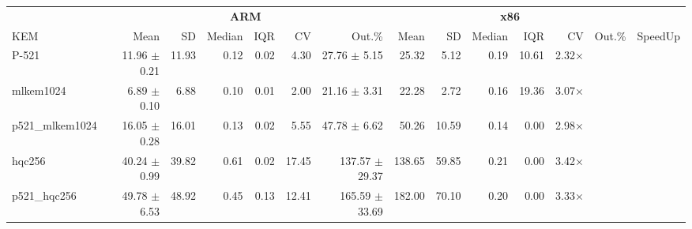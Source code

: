 \begin{table}[!ht]
\centering
\begin{tabular}{l|rrrrrr|rrrrrr|r}
\toprule
& \multicolumn{6}{c}{\bfseries ARM} & \multicolumn{6}{c}{\bfseries x86} & \\
\cmidrule(lr){2-7} \cmidrule(lr){8-13}
KEM 			& Mean & SD & Median & IQR & CV & Out.\% 		    & Mean & SD & Median & IQR & CV & Out.\% & SpeedUp \\
\midrule
P-521 			& 11.96 $\pm$ 0.21 & 11.93 & 0.12 & 0.02 & 4.30 	& 27.76 $\pm$ 5.15 & 25.32 & 5.12 & 0.19 & 10.61 & 2.32× \\
mlkem1024 		&  6.89 $\pm$ 0.10 & 6.88 & 0.10 & 0.01 & 2.00 		& 21.16 $\pm$ 3.31 & 22.28 & 2.72 & 0.16 & 19.36 & 3.07× \\
p521_mlkem1024 	& 16.05 $\pm$ 0.28 & 16.01 & 0.13 & 0.02 & 5.55 	& 47.78 $\pm$ 6.62 & 50.26 & 10.59 & 0.14 & 0.00 & 2.98× \\
hqc256 			& 40.24 $\pm$ 0.99 & 39.82 & 0.61 & 0.02 & 17.45 	& 137.57 $\pm$ 29.37 & 138.65 & 59.85 & 0.21 & 0.00 & 3.42× \\
p521_hqc256 	& 49.78 $\pm$ 6.53 & 48.92 & 0.45 & 0.13 & 12.41 	& 165.59 $\pm$ 33.69 & 182.00 & 70.10 & 0.20 & 0.00 & 3.33× \\
\bottomrule
\end{tabular}
\end{table}
